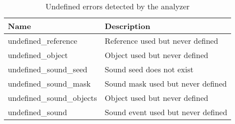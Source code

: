 \begin{table}[!htbp]
\centering
\caption{Undefined errors detected by the analyzer}
\label{tab:static_errors_undefined}
\scriptsize
\begin{tabular}{ll}
\textbf{Name} & \textbf{Description}                                                                    \\ \hline
undefined\_reference                                & Reference used but never defined                                               \\
undefined\_object                                   & Object used but never defined                                                  \\
undefined\_sound\_seed                              & Sound seed does not exist                                                      \\
undefined\_sound\_mask                              & Sound mask used but never defined                                              \\
undefined\_sound\_objects                           & Object used but never defined                                                  \\
undefined\_sound                                    & Sound event used but never defined                                             \\
\end{tabular}
\end{table}

